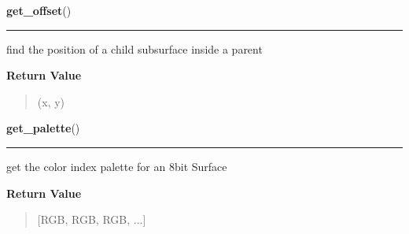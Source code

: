     \vspace{0.5ex}

\hspace{.8\funcindent}\begin{boxedminipage}{\funcwidth}

    \raggedright \textbf{get\_offset}()

    \vspace{-1.5ex}

    \rule{\textwidth}{0.5\fboxrule}
\setlength{\parskip}{2ex}
    find the position of a child subsurface inside a parent

\setlength{\parskip}{1ex}
      \textbf{Return Value}
    \vspace{-1ex}

      \begin{quote}
      (x, y)

      \end{quote}

    \end{boxedminipage}

    \label{pygame:Surface:get_palette}

    \vspace{0.5ex}

\hspace{.8\funcindent}\begin{boxedminipage}{\funcwidth}

    \raggedright \textbf{get\_palette}()

    \vspace{-1.5ex}

    \rule{\textwidth}{0.5\fboxrule}
\setlength{\parskip}{2ex}
    get the color index palette for an 8bit Surface

\setlength{\parskip}{1ex}
      \textbf{Return Value}
    \vspace{-1ex}

      \begin{quote}
      [RGB, RGB, RGB, ...]

      \end{quote}

    \end{boxedminipage}

    \label{pygame:Surface:get_palette_at}

    \vspace{0.5ex}

